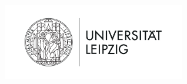 \begin{titlepage}
    \begin{addmargin}[-1cm]{-3cm}
    \begin{center}
        \large

        \hfill

        \vfill

        \begingroup
            \color{CTtitle}\spacedallcaps{\myTitle} \\ \bigskip
        \endgroup

        \spacedlowsmallcaps{\myName}

        \vfill

        \includegraphics[width=8cm]{images/Uni-L.png} \\ \medskip

        \myDepartment \\
        \myFaculty \\
        \myUni \\ \bigskip

        \myTime\ %

        \vfill

    \end{center}
  \end{addmargin}
\end{titlepage}
